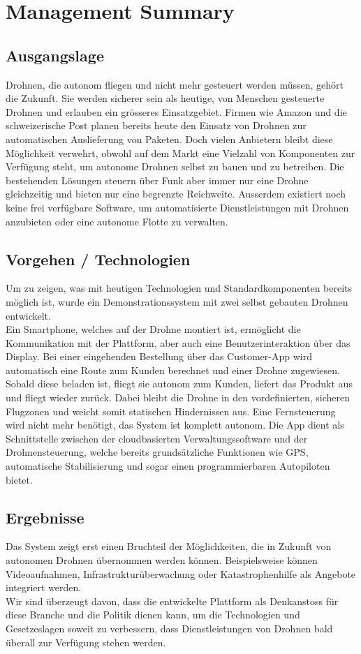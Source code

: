 \newpage
{}
\chapter*{Management Summary}
\section*{Ausgangslage}
Drohnen, die autonom fliegen und nicht mehr gesteuert werden müssen, gehört die Zukunft. Sie werden sicherer sein als heutige, von Menschen gesteuerte Drohnen und erlauben ein grösseres Einsatzgebiet. Firmen wie Amazon und die schweizerische Post planen bereits heute den Einsatz von Drohnen zur automatischen Auslieferung von Paketen. Doch vielen Anbietern bleibt diese Möglichkeit verwehrt, obwohl auf dem Markt eine Vielzahl von Komponenten zur Verfügung steht, um autonome Drohnen selbst zu bauen und zu betreiben. Die bestehenden Lösungen steuern über Funk aber immer nur eine Drohne gleichzeitig und bieten nur eine begrenzte Reichweite. Ausserdem existiert noch keine frei verfügbare Software, um automatisierte Dienstleistungen mit Drohnen anzubieten oder eine autonome Flotte zu verwalten.

\section*{Vorgehen / Technologien}
Um zu zeigen, was mit heutigen Technologien und Standardkomponenten bereits möglich ist, wurde ein Demonstrationssystem mit zwei selbst gebauten Drohnen entwickelt. \\

Ein Smartphone, welches auf der Drohne montiert ist, ermöglicht die Kommunikation mit der Plattform, aber auch eine Benutzerinteraktion über das Display. Bei einer eingehenden Bestellung über das Customer-App wird automatisch eine Route zum Kunden berechnet und einer Drohne zugewiesen. Sobald diese beladen ist, fliegt sie autonom zum Kunden, liefert das Produkt aus und fliegt wieder zurück. Dabei bleibt die Drohne in den vordefinierten, sicheren Flugzonen und weicht somit statischen Hindernissen aus. Eine Fernsteuerung wird nicht mehr benötigt, das System ist komplett autonom. Die App dient als Schnittstelle zwischen der cloudbasierten Verwaltungssoftware und der Drohnensteuerung, welche bereits grundsätzliche Funktionen wie GPS, automatische Stabilisierung und sogar einen programmierbaren Autopiloten bietet.

\section*{Ergebnisse}
Das System zeigt erst einen Bruchteil der Möglichkeiten, die in Zukunft von autonomen Drohnen übernommen werden können. Beispielsweise können Videoaufnahmen, Infrastrukturüberwachung oder Katastrophenhilfe als Angebote integriert werden. \\

Wir sind überzeugt davon, dass die entwickelte Plattform als Denkanstoss für diese Branche und die Politik dienen kann, um die Technologien und Gesetzeslagen soweit zu verbessern, dass Dienstleistungen von Drohnen bald überall zur Verfügung stehen werden.
